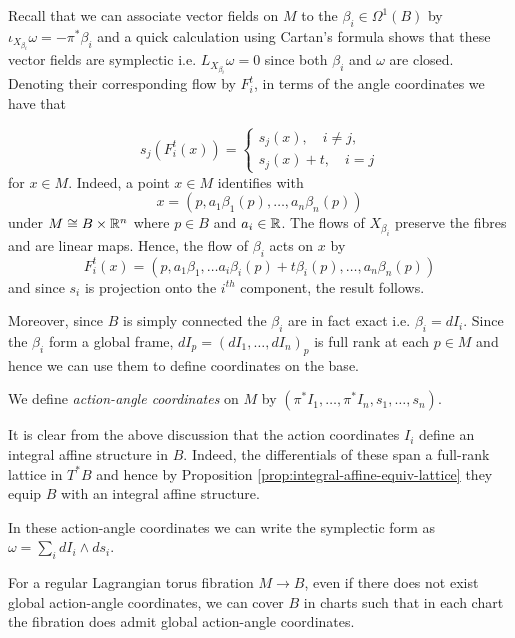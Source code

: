Recall that we can associate vector fields on $M$ to the $\beta_i \in
    \Omega^1(B)$ by $\iota_{X_{\beta_i}} \omega = -\pi^* \beta_i$ and a quick
calculation using Cartan's formula shows that these vector fields are
symplectic i.e. $L_{X_{\beta_i}}\omega = 0$ since both $\beta_i$ and $\omega$
are closed. Denoting their corresponding flow by $F_i^t$, in terms of the angle
coordinates we have that

$$
    s_j(F_i^t(x)) =\begin{cases*}
        s_j(x), \quad i \neq j, \\
        s_j(x) + t, \quad i = j
    \end{cases*}
$$
for $x \in M$. Indeed, a point $x \in M$ identifies with
$$
    x = (p, a_1 \beta_1(p), \dots , a_n \beta_n(p))
$$
under $M \cong B \times \mathbb{R}^n$ where $p \in B$ and $a_i \in \mathbb{R}$. The flows of $X_{\beta_i}$ preserve the fibres and are linear maps. Hence, the flow of $\beta_i$
acts on $x$ by
$$
    F_i^t(x) = (p, a_1 \beta_1 ,  \dots a_i \beta_i(p) + t \beta_i(p), \dots , a_n \beta_n(p))
$$
and since $s_i$ is projection onto the $i^{th}$ component, the result follows.

Moreover, since $B$ is simply connected the $\beta_i$ are in fact exact i.e.
$\beta_i = dI_i$. Since the $\beta_i$ form a global frame, $dI_p = (dI_1, \dots
    , dI_n)_p$ is full rank at each $p \in M$ and hence we can use them to define
coordinates on the base.

\begin{definition}
    We define \emph{action-angle coordinates} on $M$ by $(\pi^*I_1, \dots , \pi^* I_n, s_1, \dots , s_n)$.
\end{definition}
\begin{remark}
    It is clear from the above discussion that the action coordinates $I_i$ define an integral affine structure in $B$. Indeed, the differentials
    of these span a full-rank lattice in $T^*B$ and hence by Proposition \ref{prop:integral-affine-equiv-lattice} they equip $B$ with an integral affine structure.
\end{remark}
\begin{remark}
    In these action-angle coordinates we can write the symplectic form as $ \omega
        = \sum_i dI_i \wedge ds_i. $
\end{remark}
\begin{remark}
    For a regular Lagrangian torus fibration $M \to B$, even if there does not exist global action-angle coordinates, we can cover $B$ in
    charts such that in each chart the fibration does admit global action-angle coordinates.
\end{remark}

